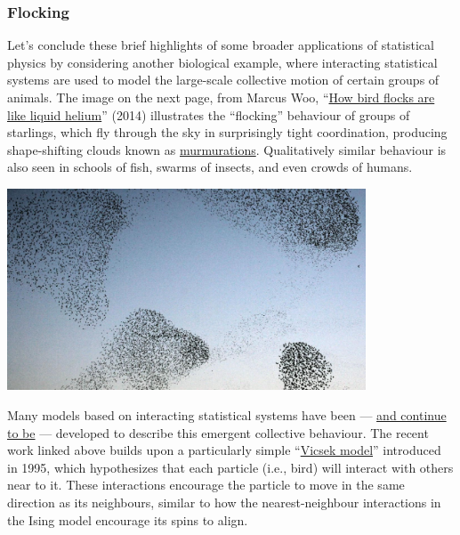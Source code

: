 \subsubsection*{Flocking}
Let's conclude these brief highlights of some broader applications of statistical physics by considering another biological example, where interacting statistical systems are used to model the large-scale collective motion of certain groups of animals.
The image on the next page, from Marcus Woo, ``\href{https://www.sciencemag.org/news/2014/07/how-bird-flocks-are-liquid-helium}{How bird flocks are like liquid helium}'' (2014) illustrates the ``flocking'' behaviour of groups of starlings, which fly through the sky in surprisingly tight coordination, producing shape-shifting clouds known as \href{https://www.youtube.com/watch?v=V4f_1_r80RY}{murmurations}.
Qualitatively similar behaviour is also seen in schools of fish, swarms of insects, and even crowds of humans.

\begin{center}\includegraphics[width=0.8\textwidth]{figs/unit10_flock.pdf}\end{center}

Many models based on interacting statistical systems have been --- \href{https://doi.org/10.1038/s41467-022-29883-4}{and continue to be} --- developed to describe this emergent collective behaviour.
The recent work linked above builds upon a particularly simple ``\href{https://en.wikipedia.org/wiki/Vicsek_model}{Vicsek model}'' introduced in 1995, which hypothesizes that each particle (i.e., bird) will interact with others near to it.
These interactions encourage the particle to move in the same direction as its neighbours, similar to how the nearest-neighbour interactions in the Ising model encourage its spins to align.

